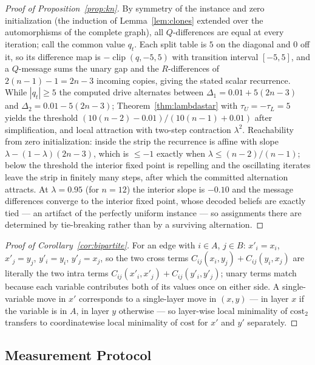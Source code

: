\begin{proof}[Proof of Proposition~\ref{prop:kn}]
By symmetry of the instance and zero initialization (the induction of
Lemma~\ref{lem:clones} extended over the automorphisms of the complete
graph), all $Q$-differences are equal at every iteration; call the
common value $q_t$.  Each split table is $5$ on the diagonal and $0$ off
it, so its difference map is $-\operatorname{clip}(q, -5, 5)$ with
transition interval $[-5, 5]$, and a $Q$-message sums the unary gap and
the $R$-differences of $2(n-1) - 1 = 2n-3$ incoming copies, giving the
stated scalar recurrence.  While $|q_t| \ge 5$ the computed drive
alternates between $\Delta_1 = 0.01 + 5(2n-3)$ and
$\Delta_2 = 0.01 - 5(2n-3)$; Theorem~\ref{thm:lambdastar} with
$\tau_U = -\tau_L = 5$ yields the threshold
$(10(n-2) - 0.01)/(10(n-1) + 0.01)$ after simplification, and local
attraction with two-step contraction $\lambda^{2}$.  Reachability from
zero initialization: inside the strip the recurrence is affine with slope
$\lambda - (1-\lambda)(2n-3)$, which is $\le -1$ exactly when
$\lambda \le (n-2)/(n-1)$; below the threshold the interior fixed point
is repelling and the oscillating iterates leave the strip in finitely
many steps, after which the committed alternation attracts.  At
$\lambda = 0.95$ (for $n = 12$) the interior slope is $-0.10$ and the
message differences converge to the interior fixed point, whose decoded
beliefs are exactly tied --- an artifact of the perfectly uniform
instance --- so assignments there are determined by tie-breaking rather
than by a surviving alternation.
\end{proof}

\begin{proof}[Proof of Corollary~\ref{cor:bipartite}]
For an edge with $i \in A$, $j \in B$: $x'_i = x_i$, $x'_j = y_j$,
$y'_i = y_i$, $y'_j = x_j$, so the two cross terms
$C_{ij}(x_i, y_j) + C_{ij}(y_i, x_j)$ are literally the two intra terms
$C_{ij}(x'_i, x'_j) + C_{ij}(y'_i, y'_j)$; unary terms match because
each variable contributes both of its values once on either side.  A
single-variable move in $x'$ corresponds to a single-layer move in
$(x,y)$ --- in layer $x$ if the variable is in $A$, in layer $y$
otherwise --- so layer-wise local minimality of $\mathrm{cost}_2$
transfers to coordinatewise local minimality of $\mathrm{cost}$ for $x'$
and $y'$ separately.
\end{proof}

\subsection{Measurement Protocol}

